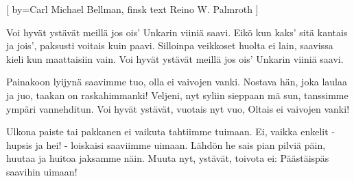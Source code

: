 [
	by={Carl Michael Bellman, finsk text Reino W. Palmroth}
]
	
\beginverse*						
Voi hyvät ystävät meillä jos ois’
Unkarin viiniä saavi.
Eikö kun kaks’ sitä kantais ja jois’,
paksusti voitais kuin paavi.
Silloinpa veikkoset huolta ei lain,
saavissa kieli kun maattaisiin vain.
Voi hyvät ystävät meillä jos ois’
Unkarin viiniä saavi.
\endverse		

\beginverse*						
Painakoon lyijynä saavimme tuo,
olla ei vaivojen vanki.
Nostava hän, joka laulaa ja juo,
taakan on raskahimmanki!
Veljeni, nyt syliin sieppaan mä sun,
tanssimme ympäri vannehditun.
Voi hyvät ystävät, vuotais nyt vuo,
Oltais ei vaivojen vanki!
\endverse	

\beginverse*						
Ulkona paiste tai pakkanen ei
vaikuta tahtiimme tuimaan.
Ei, vaikka enkelit - hupsis ja hei! - 
loiskaisi saaviimme uimaan.
Lähdön he sais pian pilviä päin,
huutaa ja huitoa jaksamme näin.
Muuta nyt, ystävät, toivota ei:
Päästäispäs saavihin uimaan!
\endverse						
\endsong		
